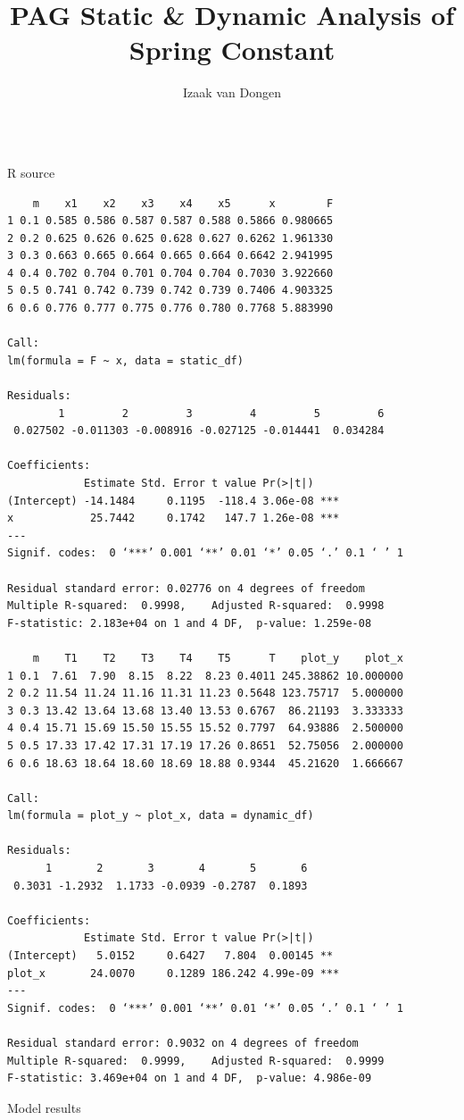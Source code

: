 \documentclass[a4paper,11pt]{article}
\title{PAG Static \& Dynamic Analysis of Spring Constant}
\author{Izaak van Dongen}
\newenvironment{longlisting}
{\addvspace{\baselineskip}\captionsetup{type=listing}}
{\addvspace{\baselineskip}}
\begin{document}
    \maketitle%

\begin{longlisting}
\inputminted{R}{analyse.r}
\caption{R source}
\end{longlisting}

\begin{longlisting}
\begin{verbatim}
    m    x1    x2    x3    x4    x5      x        F
1 0.1 0.585 0.586 0.587 0.587 0.588 0.5866 0.980665
2 0.2 0.625 0.626 0.625 0.628 0.627 0.6262 1.961330
3 0.3 0.663 0.665 0.664 0.665 0.664 0.6642 2.941995
4 0.4 0.702 0.704 0.701 0.704 0.704 0.7030 3.922660
5 0.5 0.741 0.742 0.739 0.742 0.739 0.7406 4.903325
6 0.6 0.776 0.777 0.775 0.776 0.780 0.7768 5.883990

Call:
lm(formula = F ~ x, data = static_df)

Residuals:
        1         2         3         4         5         6
 0.027502 -0.011303 -0.008916 -0.027125 -0.014441  0.034284

Coefficients:
            Estimate Std. Error t value Pr(>|t|)
(Intercept) -14.1484     0.1195  -118.4 3.06e-08 ***
x            25.7442     0.1742   147.7 1.26e-08 ***
---
Signif. codes:  0 ‘***’ 0.001 ‘**’ 0.01 ‘*’ 0.05 ‘.’ 0.1 ‘ ’ 1

Residual standard error: 0.02776 on 4 degrees of freedom
Multiple R-squared:  0.9998,	Adjusted R-squared:  0.9998
F-statistic: 2.183e+04 on 1 and 4 DF,  p-value: 1.259e-08

    m    T1    T2    T3    T4    T5      T    plot_y    plot_x
1 0.1  7.61  7.90  8.15  8.22  8.23 0.4011 245.38862 10.000000
2 0.2 11.54 11.24 11.16 11.31 11.23 0.5648 123.75717  5.000000
3 0.3 13.42 13.64 13.68 13.40 13.53 0.6767  86.21193  3.333333
4 0.4 15.71 15.69 15.50 15.55 15.52 0.7797  64.93886  2.500000
5 0.5 17.33 17.42 17.31 17.19 17.26 0.8651  52.75056  2.000000
6 0.6 18.63 18.64 18.60 18.69 18.88 0.9344  45.21620  1.666667

Call:
lm(formula = plot_y ~ plot_x, data = dynamic_df)

Residuals:
      1       2       3       4       5       6
 0.3031 -1.2932  1.1733 -0.0939 -0.2787  0.1893

Coefficients:
            Estimate Std. Error t value Pr(>|t|)
(Intercept)   5.0152     0.6427   7.804  0.00145 **
plot_x       24.0070     0.1289 186.242 4.99e-09 ***
---
Signif. codes:  0 ‘***’ 0.001 ‘**’ 0.01 ‘*’ 0.05 ‘.’ 0.1 ‘ ’ 1

Residual standard error: 0.9032 on 4 degrees of freedom
Multiple R-squared:  0.9999,	Adjusted R-squared:  0.9999
F-statistic: 3.469e+04 on 1 and 4 DF,  p-value: 4.986e-09
\end{verbatim}
\caption{Model results}
\end{longlisting}
\end{document}
